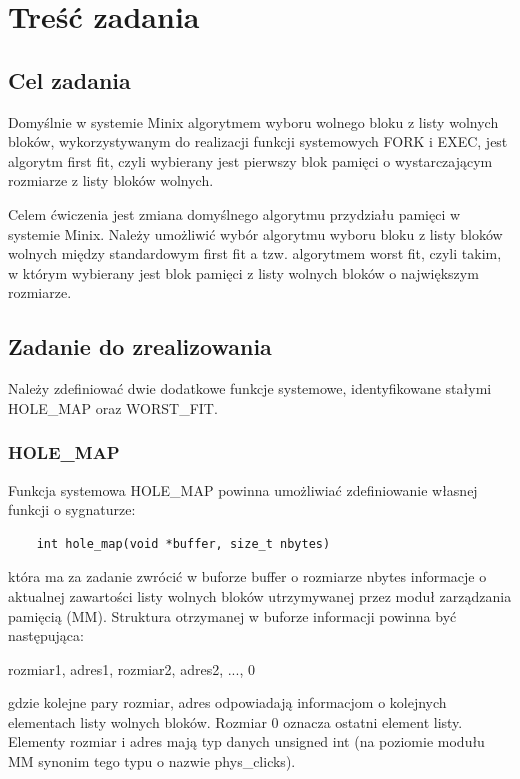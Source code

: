 \documentclass{mwrep}
\begin{document}
\chapter{Treść zadania}
\label{TRESC}

\section{Cel zadania}
\label{TRESC::CEL}
Domyślnie w systemie Minix algorytmem wyboru wolnego bloku z listy
wolnych bloków, wykorzystywanym do realizacji funkcji systemowych FORK i
EXEC, jest algorytm first fit, czyli wybierany jest pierwszy blok
pamięci o wystarczającym rozmiarze z listy bloków wolnych.

Celem ćwiczenia jest zmiana domyślnego algorytmu przydziału pamięci w
systemie Minix. Należy umożliwić wybór algorytmu wyboru bloku z listy
bloków wolnych między standardowym first fit a tzw. algorytmem worst
fit, czyli takim, w którym wybierany jest blok pamięci z listy wolnych
bloków o największym rozmiarze.
\section{Zadanie do zrealizowania}
\label{TRESC::ZADANIE}
Należy zdefiniować dwie dodatkowe funkcje systemowe, identyfikowane stałymi
HOLE\_{}MAP oraz WORST\_{}FIT.

\subsection{HOLE\_{}MAP}
\label{TRESC::ZADANIE::HOLEMAP}
Funkcja systemowa HOLE\_{}MAP powinna umożliwiać zdefiniowanie własnej
funkcji o sygnaturze:

\begin{lstlisting}
    int hole_map(void *buffer, size_t nbytes)  
\end{lstlisting}

która ma za zadanie zwrócić w buforze buffer o rozmiarze nbytes informacje o
aktualnej zawartości listy wolnych bloków utrzymywanej przez moduł
zarządzania pamięcią (MM). Struktura otrzymanej w buforze informacji powinna
być następująca: 
  
  rozmiar1, adres1, rozmiar2, adres2, ..., 0

gdzie kolejne pary rozmiar, adres odpowiadają informacjom o kolejnych
elementach listy wolnych bloków. Rozmiar 0 oznacza ostatni element listy.
Elementy rozmiar i adres mają typ danych unsigned int (na poziomie modułu MM
synonim tego typu o nazwie phys\_{}clicks).
\end{document}
